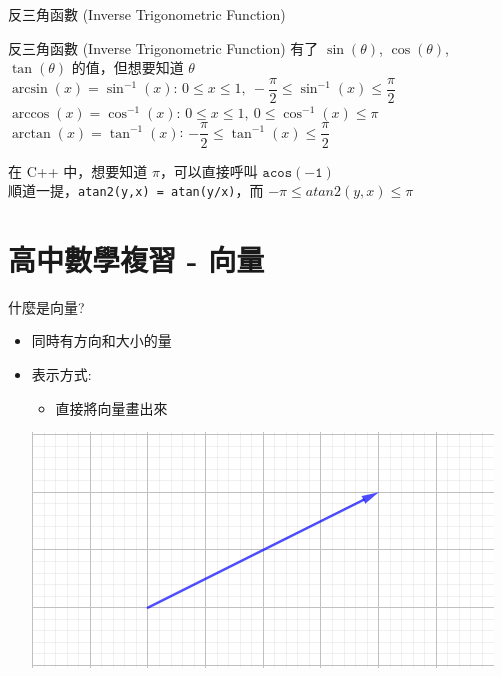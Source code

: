 \documentclass[aspectratio=169]{beamer}
\begin{document}
\begin{frame}{反三角函數 (Inverse Trigonometric Function)}
    \begin{alertblock}{反三角函數 (Inverse Trigonometric Function)}
        有了 $\sin(\theta)$, $\cos(\theta)$, $\tan(\theta)$ 的值，但想要知道 $\theta$ \\
        \vspace{5mm}
        $\arcsin(x) = \sin^{-1}(x)$: $0 \le x \le 1, \ -\dfrac{\pi}{2} \le \sin^{-1}(x) \le \dfrac{\pi}{2}$ \\
        \vspace{2.5mm}
        $\arccos(x) = \cos^{-1}(x)$: $0 \le x \le 1, \ 0 \le \cos^{-1}(x) \le \pi$ \\
        \vspace{2.5mm}
        $\arctan(x) = \tan^{-1}(x)$: $-\dfrac{\pi}{2} \le \tan^{-1}(x) \le \dfrac{\pi}{2}$
    \end{alertblock}
    在 C++ 中，想要知道 $\pi$，可以直接呼叫 $\mathtt{acos(-1)}$ \\
    \vspace{2.5mm}
    順道一提，\texttt{atan2(y,x) = atan(y/x)}，而 $-\pi \le atan2(y,x) \le \pi$
\end{frame}

\section{高中數學複習 - 向量}

\begin{frame}{什麼是向量?}
    \begin{itemize}
        \item<1-> 同時有方向和大小的量
        \item<2-> 表示方式:
        \begin{itemize}
            \item 直接將向量畫出來
        \end{itemize}
        \begin{center}
            \includegraphics[scale=0.5]{images/vector.png}
        \end{center}
    \end{itemize}
\end{frame}
\end{document}
